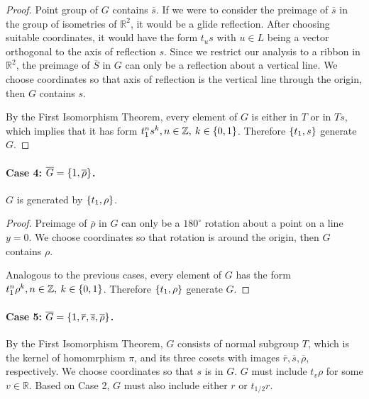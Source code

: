 \documentclass{article}
\theoremstyle{definition}
\newcommand{\R}{\mathbb{R}}
\newcommand{\Z}{\mathbb{Z}}
\DeclarePairedDelimiter\set{\{}{\}}
\begin{document}
\begin{proof}

Point group of $G$ contains $\overline{s}$.
If we were to consider the preimage of $\overline{s}$ in the group of isometries of $\R^2$, it would be a glide reflection.
After choosing suitable coordinates, it would have the form $t_u s$ with $u \in L$ being a vector orthogonal to the axis of reflection $s$.
Since we restrict our analysis to a ribbon in $\R^2$, the preimage of $\overline{S}$ in $G$ can only be a reflection about a vertical line.
We choose coordinates so that axis of reflection is the vertical line through the origin, then $G$ contains $s$.

By the First Isomorphism Theorem, every element of $G$ is either in $T$ or in $Ts$, which implies that it has form $t_1^n s^k, n \in \Z, \> k \in \set{0,1}$.
Therefore $\set{t_1, s}$ generate $G$.

\end{proof}

\paragraph{Case 4: $\overline{G} = \set{1, \overline{\rho}}$.}
$G$ is generated by $\set{t_1, \rho}$.

\begin{proof}

Preimage of $\overline{\rho}$ in $G$ can only be a $180^\circ$ rotation about a point on a line $y=0$.
We choose coordinates so that rotation is around the origin, then $G$ contains $\rho$.

Analogous to the previous cases, every element of $G$ has the form $t_1^n \rho^k, n \in \Z, \> k \in \set{0,1}$.
Therefore $\set{t_1, \rho}$ generate $G$.

\end{proof}

\paragraph{Case 5: $\overline{G} = \set{1, \overline{r}, \overline{s}, \overline{\rho}}$.}

By the First Isomorphism Theorem, $G$ consists of normal subgroup $T$, which is the kernel of homomrphism $\pi$, and its three cosets with images $\overline{r}, \overline{s}, \overline{\rho}$, respectively.
We choose coordinates so that $s$ is in $G$.
$G$ must include $t_v \rho$ for some $v \in \R$.
Based on Case 2, $G$ must also include either $r$ or $t_{1/2}r$.
\end{document}
